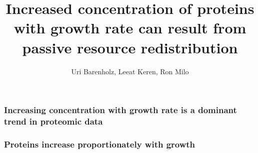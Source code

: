 \documentclass[mathserif]{beamer}
\title{Increased concentration of proteins with growth rate can result from passive resource redistribution}
\author{Uri Barenholz, Leeat Keren, Ron Milo}
\begin{document}
\maketitle

\begin{frame}
\frametitle{Increasing concentration with growth rate is a dominant trend in proteomic data}
\end{frame}

\begin{frame}
\frametitle{Proteins increase proportionately with growth}
\end{frame}
\end{document}
